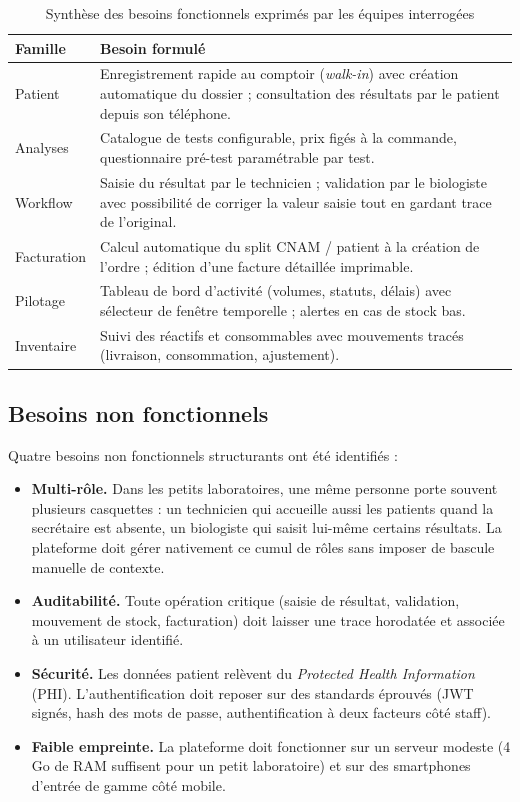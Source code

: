 \documentclass[12pt, a4paper, oneside]{report}
\begin{document}
\begin{table}[ht]
  \centering
  \caption{Synthèse des besoins fonctionnels exprimés par les équipes interrogées}
  \label{tab:besoins-fonctionnels}
  \begin{tabularx}{\linewidth}{l X}
    \toprule
    \textbf{Famille} & \textbf{Besoin formulé} \\
    \midrule
    Patient        & Enregistrement rapide au comptoir (\emph{walk-in}) avec création automatique du dossier ; consultation des résultats par le patient depuis son téléphone. \\
    Analyses       & Catalogue de tests configurable, prix figés à la commande, questionnaire pré-test paramétrable par test. \\
    Workflow       & Saisie du résultat par le technicien ; validation par le biologiste avec possibilité de corriger la valeur saisie tout en gardant trace de l'original. \\
    Facturation    & Calcul automatique du split CNAM / patient à la création de l'ordre ; édition d'une facture détaillée imprimable. \\
    Pilotage       & Tableau de bord d'activité (volumes, statuts, délais) avec sélecteur de fenêtre temporelle ; alertes en cas de stock bas. \\
    Inventaire     & Suivi des réactifs et consommables avec mouvements tracés (livraison, consommation, ajustement). \\
    \bottomrule
  \end{tabularx}
\end{table}

\subsection{Besoins non fonctionnels}
Quatre besoins non fonctionnels structurants ont été identifiés :

\begin{itemize}
  \item \textbf{Multi-rôle.} Dans les petits laboratoires, une même
        personne porte souvent plusieurs casquettes : un technicien qui
        accueille aussi les patients quand la secrétaire est absente,
        un biologiste qui saisit lui-même certains résultats. La
        plateforme doit gérer nativement ce cumul de rôles sans imposer
        de bascule manuelle de contexte.
  \item \textbf{Auditabilité.} Toute opération critique (saisie de
        résultat, validation, mouvement de stock, facturation) doit
        laisser une trace horodatée et associée à un utilisateur
        identifié.
  \item \textbf{Sécurité.} Les données patient relèvent du \emph{Protected
        Health Information} (PHI). L'authentification doit reposer sur
        des standards éprouvés (JWT signés, hash des mots de passe,
        authentification à deux facteurs côté staff).
  \item \textbf{Faible empreinte.} La plateforme doit fonctionner sur
        un serveur modeste (4 Go de RAM suffisent pour un petit
        laboratoire) et sur des smartphones d'entrée de gamme côté
        mobile.
\end{itemize}
\end{document}

